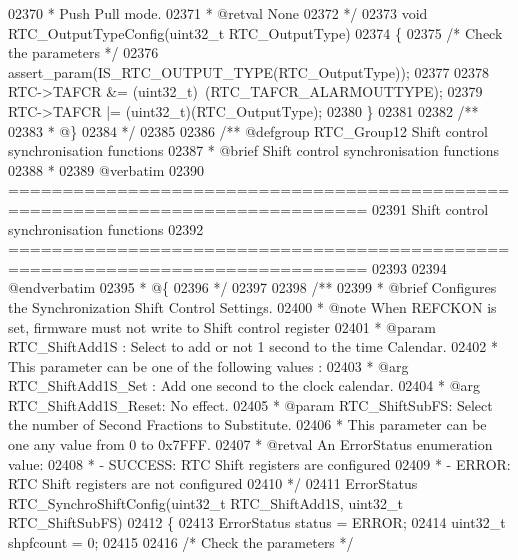 \begin{DoxyCode}
02370 \textcolor{comment}{  *                                    Push Pull mode.    }
02371 \textcolor{comment}{  * @retval None}
02372 \textcolor{comment}{  */}
02373 \textcolor{keywordtype}{void} RTC_OutputTypeConfig(uint32\_t RTC\_OutputType)
02374 \{
02375   \textcolor{comment}{/* Check the parameters */}
02376   assert_param(IS\_RTC\_OUTPUT\_TYPE(RTC\_OutputType));
02377 
02378   RTC->TAFCR &= (uint32\_t)~(RTC_TAFCR_ALARMOUTTYPE);
02379   RTC->TAFCR |= (uint32\_t)(RTC\_OutputType);
02380 \}
02381 
02382 \textcolor{comment}{/**}
02383 \textcolor{comment}{  * @\}}
02384 \textcolor{comment}{  */}
02385 
02386 \textcolor{comment}{/** @defgroup RTC\_Group12 Shift control synchronisation functions}
02387 \textcolor{comment}{ *  @brief   Shift control synchronisation functions }
02388 \textcolor{comment}{ *}
02389 \textcolor{comment}{@verbatim   }
02390 \textcolor{comment}{ ===============================================================================}
02391 \textcolor{comment}{                   Shift control synchronisation functions}
02392 \textcolor{comment}{ ===============================================================================  }
02393 \textcolor{comment}{}
02394 \textcolor{comment}{@endverbatim}
02395 \textcolor{comment}{  * @\{}
02396 \textcolor{comment}{  */}
02397 
02398 \textcolor{comment}{/**}
02399 \textcolor{comment}{  * @brief  Configures the Synchronization Shift Control Settings.}
02400 \textcolor{comment}{  * @note   When REFCKON is set, firmware must not write to Shift control register }
02401 \textcolor{comment}{  * @param  RTC\_ShiftAdd1S : Select to add or not 1 second to the time Calendar.}
02402 \textcolor{comment}{  *   This parameter can be one of the following values :}
02403 \textcolor{comment}{  *     @arg RTC\_ShiftAdd1S\_Set  : Add one second to the clock calendar. }
02404 \textcolor{comment}{  *     @arg RTC\_ShiftAdd1S\_Reset: No effect.}
02405 \textcolor{comment}{  * @param  RTC\_ShiftSubFS: Select the number of Second Fractions to Substitute.}
02406 \textcolor{comment}{  *         This parameter can be one any value from 0 to 0x7FFF.}
02407 \textcolor{comment}{  * @retval An ErrorStatus enumeration value:}
02408 \textcolor{comment}{  *          - SUCCESS: RTC Shift registers are configured}
02409 \textcolor{comment}{  *          - ERROR: RTC Shift registers are not configured}
02410 \textcolor{comment}{*/}
02411 ErrorStatus RTC_SynchroShiftConfig(uint32\_t RTC\_ShiftAdd1S, uint32\_t RTC\_ShiftSubFS)
02412 \{
02413   ErrorStatus status = ERROR;
02414   uint32\_t shpfcount = 0;
02415 
02416   \textcolor{comment}{/* Check the parameters */}

\end{DoxyCode}
